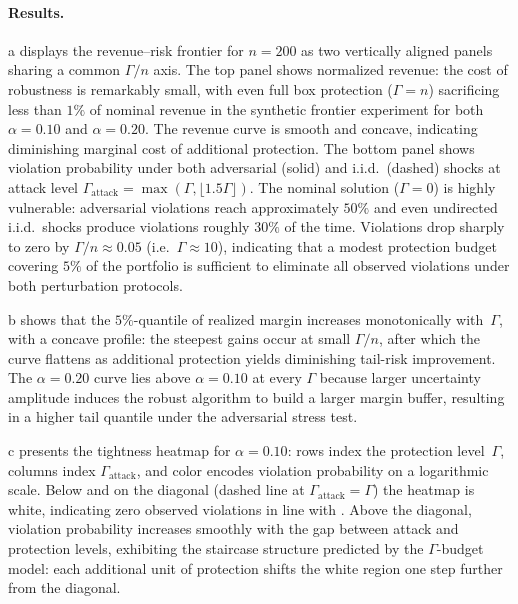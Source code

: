 \documentclass[11pt, a4paper]{article}
\theoremstyle{plain}
\theoremstyle{definition}
\theoremstyle{remark}
\begin{document}
\paragraph{Results.}
a displays the revenue--risk frontier for $n=200$ as two vertically
aligned panels sharing a common $\Gamma/n$ axis.
The top panel shows normalized revenue: the cost of robustness is remarkably small, with
even full box protection ($\Gamma=n$) sacrificing less than $1\%$ of nominal revenue in the synthetic frontier experiment for
both $\alpha=0.10$ and $\alpha=0.20$. The revenue curve is smooth and concave,
indicating diminishing marginal cost of additional protection.
The bottom panel shows violation probability under both adversarial (solid) and i.i.d.\
(dashed) shocks at attack level $\Gamma_{\mathrm{attack}}=\max(\Gamma,\lfloor1.5\Gamma\rfloor)$.
The nominal solution ($\Gamma=0$) is highly vulnerable: adversarial violations reach
approximately $50\%$ and even undirected i.i.d.\ shocks produce violations roughly $30\%$ of
the time. Violations drop sharply to zero by $\Gamma/n\approx 0.05$ (i.e.\
$\Gamma\approx 10$), indicating that a modest protection budget covering $5\%$ of the
portfolio is sufficient to eliminate all observed violations under both perturbation protocols.

\Cref{fig:risk_frontier}b shows that the $5\%$-quantile of realized margin increases
monotonically with~$\Gamma$, with a concave profile: the steepest gains occur at small
$\Gamma/n$, after which the curve flattens as additional protection yields diminishing
tail-risk improvement. The $\alpha=0.20$ curve lies above $\alpha=0.10$ at every $\Gamma$
because larger uncertainty amplitude induces the robust algorithm to build a larger margin
buffer, resulting in a higher tail quantile under the adversarial stress test.

\Cref{fig:risk_frontier}c presents the tightness heatmap for $\alpha=0.10$: rows index the
protection level~$\Gamma$, columns index $\Gamma_{\mathrm{attack}}$, and color encodes
violation probability on a logarithmic scale.
Below and on the diagonal (dashed line at $\Gamma_{\mathrm{attack}}=\Gamma$) the heatmap is
white, indicating zero observed violations in line with .
Above the diagonal, violation probability increases smoothly with the gap between attack and
protection levels, exhibiting the staircase structure predicted by the $\Gamma$-budget model:
each additional unit of protection shifts the white region one step further from the diagonal.
\end{document}
